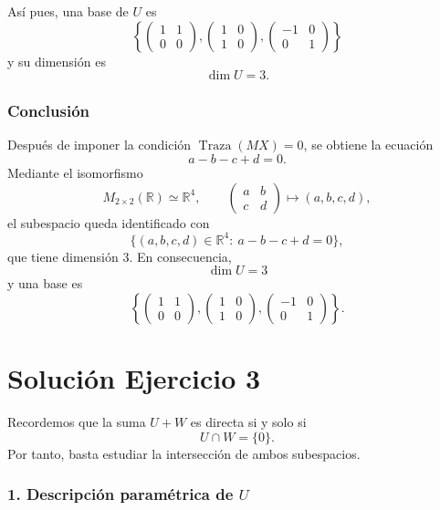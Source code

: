 \documentclass[12pt]{article}
\begin{document}
Así pues, una base de \(U\) es
\[
\boxed{
\left\{
\begin{pmatrix}
1&1\\
0&0
\end{pmatrix},
\begin{pmatrix}
1&0\\
1&0
\end{pmatrix},
\begin{pmatrix}
-1&0\\
0&1
\end{pmatrix}
\right\}}
\]
y su dimensión es
\[
\boxed{\dim U=3.}
\]

\subsubsection*{Conclusión}

Después de imponer la condición \(\operatorname{Traza}(MX)=0\), se obtiene la ecuación
\[
a-b-c+d=0.
\]
Mediante el isomorfismo
\[
M_{2\times 2}(\mathbb{R})\simeq \mathbb{R}^4,
\qquad
\begin{pmatrix}
a&b\\
c&d
\end{pmatrix}
\mapsto (a,b,c,d),
\]
el subespacio queda identificado con
\[
\{(a,b,c,d)\in\mathbb{R}^4:\ a-b-c+d=0\},
\]
que tiene dimensión \(3\). En consecuencia,
\[
\boxed{\dim U=3}
\]
y una base es
\[
\boxed{
\left\{
\begin{pmatrix}
1&1\\
0&0
\end{pmatrix},
\begin{pmatrix}
1&0\\
1&0
\end{pmatrix},
\begin{pmatrix}
-1&0\\
0&1
\end{pmatrix}
\right\}.}
\]

\section*{Solución Ejercicio 3}

Recordemos que la suma \(U+W\) es directa si y solo si
\[
U\cap W=\{0\}.
\]
Por tanto, basta estudiar la intersección de ambos subespacios.

\subsubsection*{1. Descripción paramétrica de \(U\)}
\end{document}
